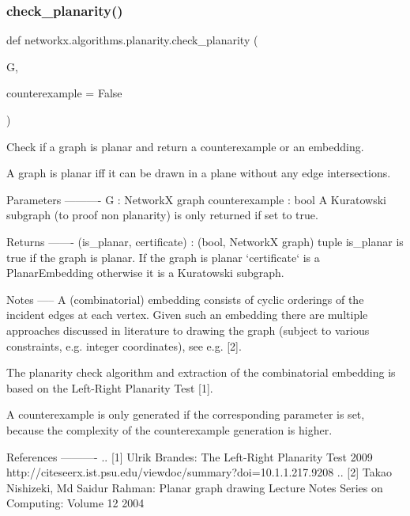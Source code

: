 \subsubsection{\texorpdfstring{check\+\_\+planarity()}{check\_planarity()}}
{\footnotesize\ttfamily def networkx.\+algorithms.\+planarity.\+check\+\_\+planarity (\begin{DoxyParamCaption}\item[{}]{G,  }\item[{}]{counterexample = {\ttfamily False} }\end{DoxyParamCaption})}

\begin{DoxyVerb}Check if a graph is planar and return a counterexample or an embedding.

A graph is planar iff it can be drawn in a plane without
any edge intersections.

Parameters
----------
G : NetworkX graph
counterexample : bool
    A Kuratowski subgraph (to proof non planarity) is only returned if set
    to true.

Returns
-------
(is_planar, certificate) : (bool, NetworkX graph) tuple
    is_planar is true if the graph is planar.
    If the graph is planar `certificate` is a PlanarEmbedding
    otherwise it is a Kuratowski subgraph.

Notes
-----
A (combinatorial) embedding consists of cyclic orderings of the incident
edges at each vertex. Given such an embedding there are multiple approaches
discussed in literature to drawing the graph (subject to various
constraints, e.g. integer coordinates), see e.g. [2].

The planarity check algorithm and extraction of the combinatorial embedding
is based on the Left-Right Planarity Test [1].

A counterexample is only generated if the corresponding parameter is set,
because the complexity of the counterexample generation is higher.

References
----------
.. [1] Ulrik Brandes:
    The Left-Right Planarity Test
    2009
    http://citeseerx.ist.psu.edu/viewdoc/summary?doi=10.1.1.217.9208
.. [2] Takao Nishizeki, Md Saidur Rahman:
    Planar graph drawing
    Lecture Notes Series on Computing: Volume 12
    2004
\end{DoxyVerb}
 \mbox{\label{namespacenetworkx_1_1algorithms_1_1planarity_a24f924dcf458682337d2a5d97582f027}} 
